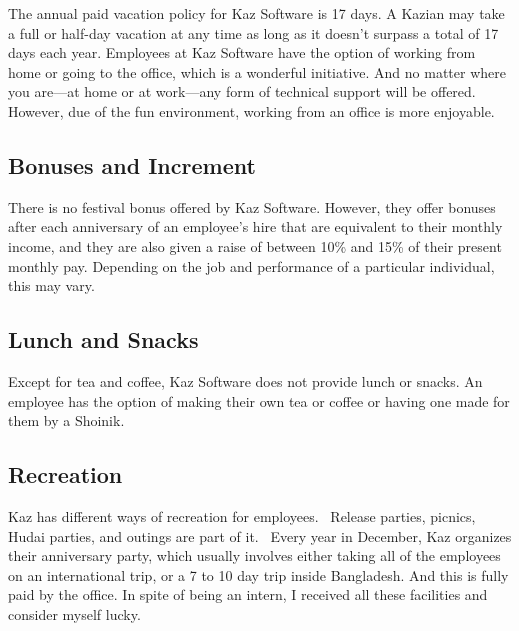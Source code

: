 The annual paid vacation policy for Kaz Software is 17 days.
A Kazian may take a full or half-day vacation at any time as long as it doesn't surpass a total of 17 days each year.
Employees at Kaz Software have the option of working from home or going to the office, which is a wonderful initiative.
And no matter where you are—at home or at work—any form of technical support will be offered.
However, due of the fun environment, working from an office is more enjoyable.

\subsection{Bonuses and Increment}

There is no festival bonus offered by Kaz Software.
However, they offer bonuses after each anniversary of an employee's hire that are equivalent to their monthly income, and they are also given a raise of between 10\% and 15\% of their present monthly pay.
Depending on the job and performance of a particular individual, this may vary.

\subsection{Lunch and Snacks}

Except for tea and coffee, Kaz Software does not provide lunch or snacks.
An employee has the option of making their own tea or coffee or having one made for them by a Shoinik.

\subsection{Recreation}

Kaz has different ways of recreation for employees. 
Release parties, picnics, Hudai parties, and outings are part of it. 
Every year in December, Kaz organizes their anniversary party, which usually involves either taking all of the employees on an international trip, or a 7 to 10 day trip inside Bangladesh.
And this is fully paid by the office.
In spite of being an intern, I received all these facilities and consider myself lucky.
\\

